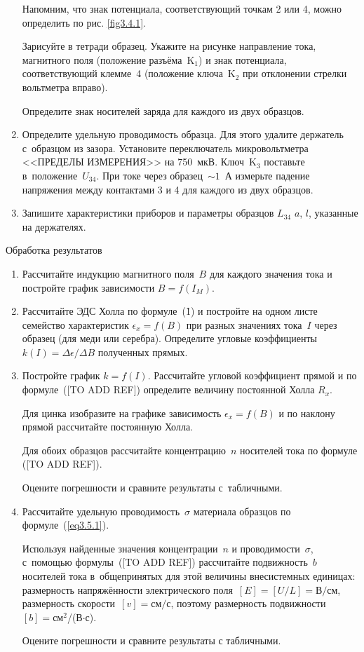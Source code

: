 \begin{enumerate}
{Напомним, что знак потенциала, соответствующий точкам 2 или 4, можно определить по рис. \ref{fig3.4.1}.

Зарисуйте в тетради образец. Укажите на рисунке направление тока, магнитного поля (положение разъёма~K$_1$) и знак
потенциала, соответствующий клемме~4 (положение ключа~K$_2$ при отклонении стрелки вольтметра вправо).

Определите знак носителей заряда для каждого из двух образцов.
}
\item{Определите удельную проводимость образца. Для этого удалите держатель с~образцом из зазора. Установите переключатель микровольтметра <<ПРЕДЕЛЫ ИЗМЕРЕНИЯ>> на 750~мкВ. Ключ~K$_3$ поставьте в~положение~$U_{34}$. При токе через образец~$\sim 1$~А измерьте падение напряжения между контактами 3 и 4 для каждого из двух образцов.}

\item{ Запишите характеристики приборов и параметры образцов $L_{34}$ $a$, $l$, указанные на держателях.}
\end{enumerate}

{\rm Обработка результатов}
\begin{enumerate}
\item{Рассчитайте индукцию магнитного поля~$B$ для каждого значения тока и постройте график зависимости $B=f(I_{M})$.}

\item{Рассчитайте ЭДС Холла по формуле~(\r1) и постройте на одном листе семейство характеристик $\epsilon_x=f(B)$ при разных значениях тока~$I$ через образец (для меди или серебра). Определите угловые коэффициенты~$k(I)=\Delta\epsilon/\Delta B$ полученных прямых.}

\item{ Постройте график $k=f(I)$. Рассчитайте угловой коэффициент прямой и по формуле~([TO ADD REF]) определите величину постоянной Холла $R_x$.

Для цинка изобразите на графике зависимость $\epsilon_x=f(B)$ и по наклону прямой рассчитайте постоянную Холла.

Для обоих образцов рассчитайте концентрацию~$n$ носителей тока по формуле ([TO ADD REF]).

Оцените погрешности и сравните результаты с~табличными.}

\item{ Рассчитайте удельную проводимость~$\sigma$ материала образцов по формуле~(\ref{eq3.5.1}).

Используя найденные значения концентрации~$n$ и проводимости~$\sigma$, с~помощью формулы~([TO ADD REF]) рассчитайте подвижность~$b$ носителей тока в~общепринятых для этой величины внесистемных единицах: размерность напряжённости электрического поля~$[E]=[U/L]=В/см$, размерность скорости~$[v]=см/с$, поэтому размерность подвижности $[b]=$см$^2$/(В$\cdot$с).

Оцените погрешности и сравните результаты с табличными.
}
\end{enumerate}

